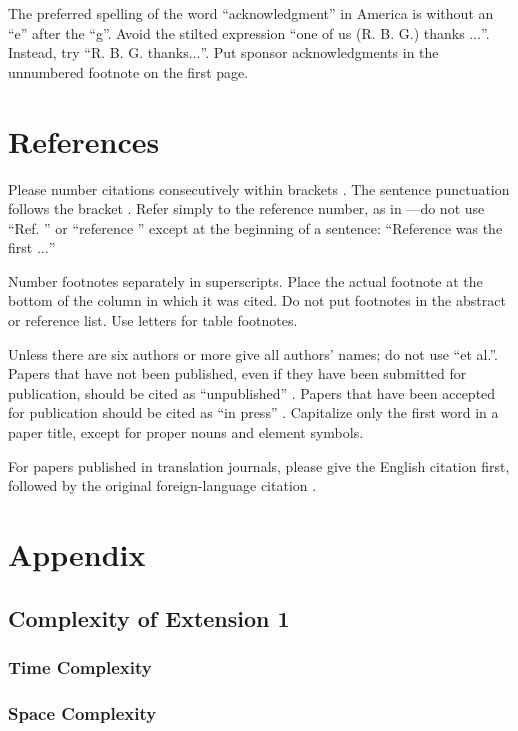 \documentclass[conference]{IEEEtran}
\begin{document}
The preferred spelling of the word ``acknowledgment'' in America is without 
an ``e'' after the ``g''. Avoid the stilted expression ``one of us (R. B. 
G.) thanks $\ldots$''. Instead, try ``R. B. G. thanks$\ldots$''. Put sponsor 
acknowledgments in the unnumbered footnote on the first page.

\section*{References}

Please number citations consecutively within brackets \cite{b1}. The 
sentence punctuation follows the bracket \cite{b2}. Refer simply to the reference 
number, as in \cite{b3}---do not use ``Ref. \cite{b3}'' or ``reference \cite{b3}'' except at 
the beginning of a sentence: ``Reference \cite{b3} was the first $\ldots$''

Number footnotes separately in superscripts. Place the actual footnote at 
the bottom of the column in which it was cited. Do not put footnotes in the 
abstract or reference list. Use letters for table footnotes.

Unless there are six authors or more give all authors' names; do not use 
``et al.''. Papers that have not been published, even if they have been 
submitted for publication, should be cited as ``unpublished'' \cite{b4}. Papers 
that have been accepted for publication should be cited as ``in press'' \cite{b5}. 
Capitalize only the first word in a paper title, except for proper nouns and 
element symbols.

For papers published in translation journals, please give the English 
citation first, followed by the original foreign-language citation \cite{b6}.

\section{Appendix}

\subsection{Complexity of Extension 1}

\subsubsection{Time Complexity}

\subsubsection{Space Complexity}
\end{document}
